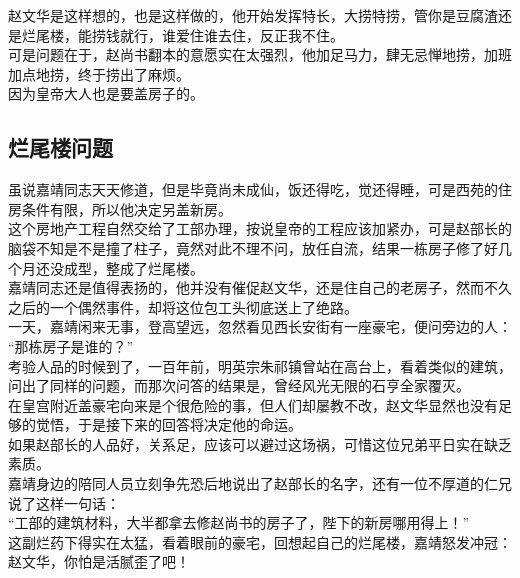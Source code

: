 \begin{multicols}{\theparacolNo}
赵文华是这样想的，也是这样做的，他开始发挥特长，大捞特捞，管你是豆腐渣还是烂尾楼，能捞钱就行，谁爱住谁去住，反正我不住。\\

可是问题在于，赵尚书翻本的意愿实在太强烈，他加足马力，肆无忌惮地捞，加班加点地捞，终于捞出了麻烦。\\

因为皇帝大人也是要盖房子的。\\

\subsection{烂尾楼问题}
虽说嘉靖同志天天修道，但是毕竟尚未成仙，饭还得吃，觉还得睡，可是西苑的住房条件有限，所以他决定另盖新房。\\

这个房地产工程自然交给了工部办理，按说皇帝的工程应该加紧办，可是赵部长的脑袋不知是不是撞了柱子，竟然对此不理不问，放任自流，结果一栋房子修了好几个月还没成型，整成了烂尾楼。\\

嘉靖同志还是值得表扬的，他并没有催促赵文华，还是住自己的老房子，然而不久之后的一个偶然事件，却将这位包工头彻底送上了绝路。\\

一天，嘉靖闲来无事，登高望远，忽然看见西长安街有一座豪宅，便问旁边的人：\\

“那栋房子是谁的？”\\

考验人品的时候到了，一百年前，明英宗朱祁镇曾站在高台上，看着类似的建筑，问出了同样的问题，而那次问答的结果是，曾经风光无限的石亨全家覆灭。\\

在皇宫附近盖豪宅向来是个很危险的事，但人们却屡教不改，赵文华显然也没有足够的觉悟，于是接下来的回答将决定他的命运。\\

如果赵部长的人品好，关系足，应该可以避过这场祸，可惜这位兄弟平日实在缺乏素质。\\

嘉靖身边的陪同人员立刻争先恐后地说出了赵部长的名字，还有一位不厚道的仁兄说了这样一句话：\\

“工部的建筑材料，大半都拿去修赵尚书的房子了，陛下的新房哪用得上！”\\

这副烂药下得实在太猛，看着眼前的豪宅，回想起自己的烂尾楼，嘉靖怒发冲冠：赵文华，你怕是活腻歪了吧！\\


\end{multicols}
